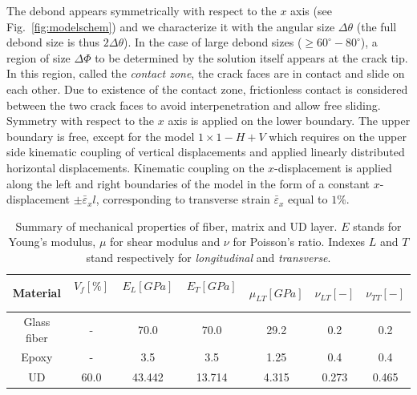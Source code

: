 \documentclass[review]{elsarticle}
\begin{document}
The debond appears symmetrically with respect to the $x$ axis (see Fig.~\ref{fig:modelschem}) and we characterize it with the angular size $\Delta\theta$ (the full debond size is thus $2\Delta\theta$). In the case of large debond sizes ($\geq 60^{\circ}-80^{\circ}$), a region of size $\Delta\Phi$ to be determined by the solution itself appears at the crack tip. In this region, called the \emph{contact zone}, the crack faces are in contact and slide on each other. Due to existence of the contact zone, frictionless contact is considered between the two crack faces to avoid interpenetration and allow free sliding. Symmetry with respect to the $x$ axis is applied on the lower boundary. The upper boundary is free, except for the model $1\times 1-H+V$ which requires on the upper side kinematic coupling of vertical displacements and applied linearly distributed horizontal displacements. Kinematic coupling on the $x$-displacement is applied along the left and right boundaries of the model in the form of a constant $x$-displacement $\pm\bar{\varepsilon}_{x} l$, corresponding to transverse strain $\bar{\varepsilon}_{x}$ equal to $1\%$.

\begin{table}[!htbp]
 \centering
 \caption{Summary of mechanical properties of fiber, matrix and UD layer. $E$ stands for Young's modulus, $\mu$ for shear modulus and $\nu$ for Poisson's ratio. Indexes $L$ and $T$ stand respectively for \emph{longitudinal} and \emph{transverse}.}
 \begin{tabular}{ccccccc}
\textbf{Material} & \textbf{$V_{f}\left[\%\right]$}\  & \textbf{$E_{L}\left[GPa\right]$}\ & \textbf{$E_{T}\left[GPa\right]$}\  & \textbf{$\mu_{LT}\left[GPa\right]$} &\textbf{$\nu_{LT}\left[-\right]$} & \textbf{$\nu_{TT}\left[-\right]$} \\
\midrule
Glass fiber &-   & 70.0 & 70.0  & 29.2 & 0.2  & 0.2\\
Epoxy    &-& 3.5 & 3.5   & 1.25 &  0.4& 0.4\\
UD&60.0&43.442&13.714& 4.315& 0.273&0.465\\
\end{tabular}
\label{tab:phaseprop}
\end{table}
\end{document}
